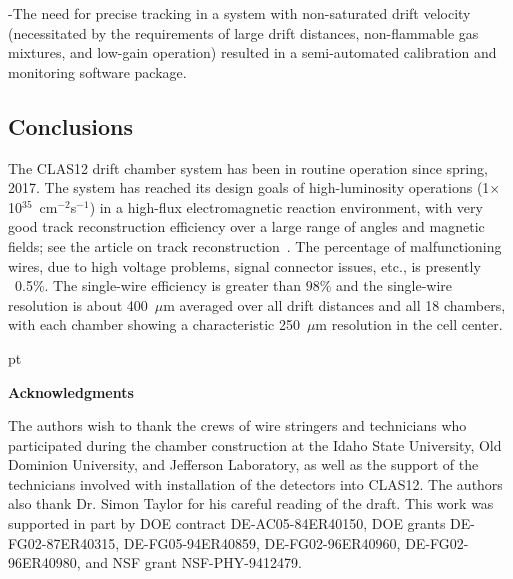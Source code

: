 \noindent
-The need for precise tracking in a system with non-saturated drift velocity 
(necessitated by the requirements of large drift distances, non-flammable gas mixtures, 
and low-gain operation) resulted in a semi-automated calibration and monitoring software 
package.

\vskip 10pt
\subsection{Conclusions}
The CLAS12 drift chamber system has been in routine operation since spring, 2017. 
The system has reached its design goals of high-luminosity operations
(1$\times$10$^{35}$~cm$^{-2}$s$^{-1}$) in a high-flux electromagnetic reaction
environment, with very good track reconstruction efficiency over a large range of angles and 
magnetic fields; see the article on track reconstruction~\cite{recon-nim}.  
The percentage of malfunctioning wires, due to high voltage problems, signal
connector issues, etc., is presently ~0.5\%.
The single-wire efficiency is greater than $98\%$ and the
single-wire resolution is about 400~$\mu$m averaged over all drift distances and
all 18 chambers, with each chamber showing a characteristic 250~$\mu$m resolution 
in the cell center.

 pt

{\large{\bf Acknowledgments}}

\vskip 10pt

The authors wish to thank the crews of wire stringers and technicians who 
participated during the chamber construction at the Idaho State University,
Old Dominion University, and Jefferson Laboratory, as well as the support of 
the technicians involved with installation of the detectors into CLAS12.  The
authors also thank Dr. Simon Taylor for his careful reading of the draft.  This
work was supported in part by DOE contract DE-AC05-84ER40150, DOE grants 
DE-FG02-87ER40315, DE-FG05-94ER40859, DE-FG02-96ER40960, DE-FG02-96ER40980, 
and NSF grant NSF-PHY-9412479.




